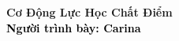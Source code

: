\begin{frame}[noframenumbering]
    \thispagestyle{empty}
    \bfseries
    \begin{flushleft}
        \vfill
        \vspace{5mm}
        \textcolor{BlueDefault}{\huge \bfseries Cơ Động Lực Học Chất Điểm} \\
        \vspace{8mm}
        \textcolor{black}{\large \bfseries Người trình bày: Carina }
        \vfill
    \end{flushleft}
\end{frame}